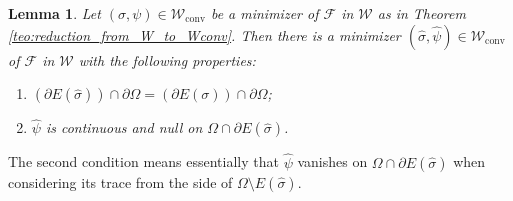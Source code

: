 \documentclass[11pt]{article}
\numberwithin{equation}{section}
\let\Om\Omega
\newcommand\admclassconv{{\mathcal W_\mathrm{conv}}}
\newtheorem{lemma}[theorem]{Lemma}
\theoremstyle{definition}
\begin{document}
\begin{lemma}\label{lem:continuita-bordo-E}
Let $(\sigma,\psi)\in \admclassconv$ be a minimizer of $\mathcal F$ in $\mathcal W$ as in
Theorem \ref{teo:reduction_from_W_to_Wconv}.
Then there is a minimizer $(\widehat\sigma,\widehat\psi)\in \admclassconv$ of $\mathcal F$ in $\mathcal W$
with the following properties:
\begin{enumerate}[{\rm (1)},wide]
\item\label{lem1.}$(\partial E(\widehat\sigma))\cap\partial\Om=(\partial E(\sigma))\cap\partial\Om$;
\item\label{lem2.} $\widehat\psi$ is continuous and null
on $\Om\cap\partial E(\widehat\sigma)$.
\end{enumerate}
\end{lemma}
The second condition means essentially that $\widehat\psi$ vanishes on $\Om\cap\partial E(\widehat\sigma)$ when considering its trace from the side of $\Om\setminus E(\widehat\sigma)$.
\end{document}
